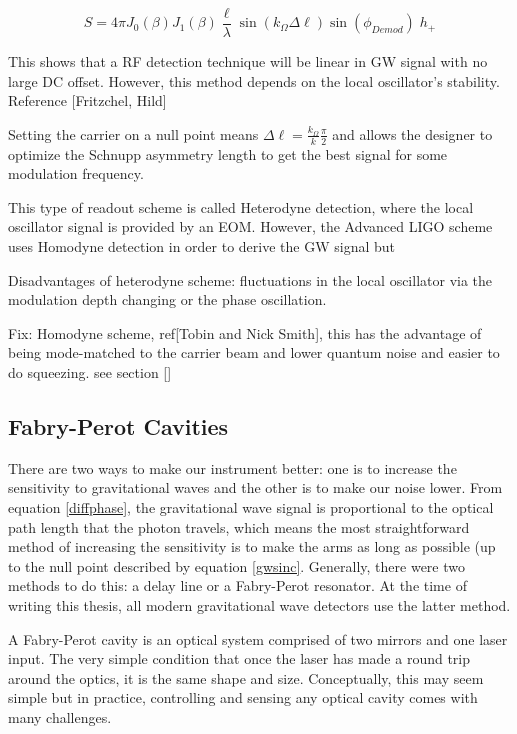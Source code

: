 		\begin{equation}
		S = 4 \pi  J_0(\beta) J_1(\beta) \frac{\ell}{\lambda}  \sin(k_{\Omega} \Delta \ell) \sin(\phi_{Demod}) \; h_{+}
		\end{equation}
		
		This shows that a RF detection technique will be linear in GW signal with no large DC offset.  However, this method depends on the local oscillator's stability. Reference [Fritzchel, Hild] 
		
		Setting the carrier on a null point means $\Delta \ell = \frac{k_{\Omega}}{k} \frac{\pi}{2}$ and allows the designer to optimize the Schnupp asymmetry length to get the best signal for some modulation frequency.
		
		This type of readout scheme is called Heterodyne detection, where the local oscillator signal is provided by an EOM.  However, the Advanced LIGO scheme uses Homodyne detection in order to derive the GW signal but 
		
		Disadvantages of heterodyne scheme: fluctuations in the local oscillator via the modulation depth changing or the phase oscillation.
		
		Fix: Homodyne scheme, ref[Tobin and Nick Smith], this has the advantage of being mode-matched to the carrier beam and lower quantum noise and easier to do squeezing. see section []
		
		
		\cite{BlackPDH}	
	
		\subsection{Fabry-Perot Cavities}\label{FP}
		There are two ways to make our instrument better: one is to increase the sensitivity to gravitational waves and the other is to make our noise lower. From equation \ref{diffphase}, the gravitational wave signal is proportional to the optical path length that the photon travels, which means the most straightforward method of increasing the sensitivity is to make the arms as long as possible (up to the null point described by equation \ref{gwsinc}.  Generally, there were two methods to do this: a delay line or a Fabry-Perot resonator.  At the time of writing this thesis, all modern gravitational wave detectors use the latter method.
	
		A Fabry-Perot cavity is an optical system comprised of two mirrors and one laser input. The very simple condition that once the laser has made a round trip around the optics, it is the same shape and size.  Conceptually, this may seem simple but in practice, controlling and sensing any optical cavity comes with many challenges.
		
